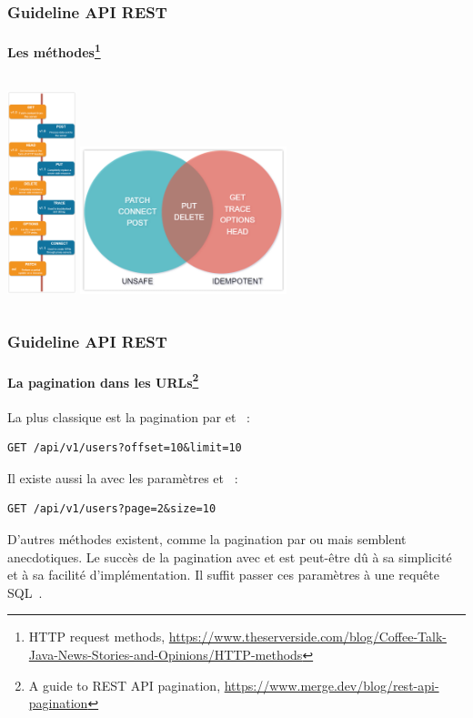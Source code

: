 \documentclass{beamer}
\begin{document}
    \begin{frame}
        \transdissolve
        \frametitle{Guideline API REST}
        \framesubtitle{Les méthodes\footnote{HTTP request methods, \url{https://www.theserverside.com/blog/Coffee-Talk-Java-News-Stories-and-Opinions/HTTP-methods}}}
        \begin{columns}
            \centering
            \includegraphics[width=2cm]{image/rest-http-methods}
            \centering
            \includegraphics[width=6cm]{image/rest-http-methods-safety}
        \end{columns}
    \end{frame}

    \begin{frame}[fragile]
        \transdissolve
        \frametitle{Guideline API REST}
        \framesubtitle{La pagination dans les URLs\footnote{A guide to REST API pagination, \url{https://www.merge.dev/blog/rest-api-pagination}}}
        La plus classique est la pagination par  et ~:
        \begin{lstlisting}
GET /api/v1/users?offset=10&limit=10
        \end{lstlisting}
        \bigbreak
        Il existe aussi la  avec les paramètres  et ~:
        \begin{lstlisting}
GET /api/v1/users?page=2&size=10
        \end{lstlisting}
        \bigbreak
        D'autres méthodes existent, comme la pagination par  ou  mais semblent anecdotiques.
        \bigbreak
        Le succès de la pagination avec  et  est peut-être dû à sa simplicité et à sa facilité d'implémentation.
        Il suffit passer ces paramètres à une requête SQL~.
    \end{frame}
\end{document}
